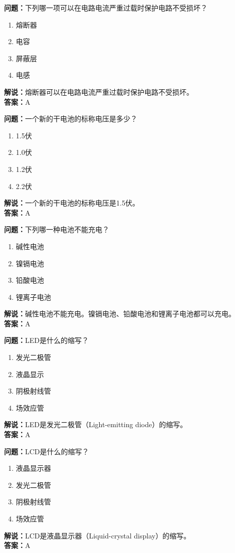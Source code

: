 \documentclass{ctexbook}%
\begin{document}
\textbf{问题：}下列哪一项可以在电路电流严重过载时保护电路不受损坏？
\begin{enumerate}[label=\Alph*), leftmargin=3em]
\item 熔断器
\item 电容
\item 屏蔽层
\item 电感
\end{enumerate}
\textbf{解说：}熔断器可以在电路电流严重过载时保护电路不受损坏。\\
\textbf{答案：}A

\textbf{问题：}一个新的干电池的标称电压是多少？
\begin{enumerate}[label=\Alph*), leftmargin=3em]
\item 1.5伏
\item 1.0伏
\item 1.2伏
\item 2.2伏
\end{enumerate}
\textbf{解说：}一个新的干电池的标称电压是1.5伏。\\
\textbf{答案：}A

\textbf{问题：}下列哪一种电池不能充电？
\begin{enumerate}[label=\Alph*), leftmargin=3em]
\item 碱性电池
\item 镍镉电池
\item 铅酸电池
\item 锂离子电池
\end{enumerate}
\textbf{解说：}碱性电池不能充电。镍镉电池、铅酸电池和锂离子电池都可以充电。\\
\textbf{答案：}A

\textbf{问题：}LED是什么的缩写？
\begin{enumerate}[label=\Alph*), leftmargin=3em]
\item 发光二极管
\item 液晶显示
\item 阴极射线管
\item 场效应管
\end{enumerate}
\textbf{解说：}LED是发光二极管（Light-emitting diode）的缩写。\\
\textbf{答案：}A

\textbf{问题：}LCD是什么的缩写？
\begin{enumerate}[label=\Alph*), leftmargin=3em]
\item 液晶显示器
\item 发光二极管
\item 阴极射线管
\item 场效应管
\end{enumerate}
\textbf{解说：}LCD是液晶显示器（Liquid-crystal display）的缩写。\\
\textbf{答案：}A
\end{document}

